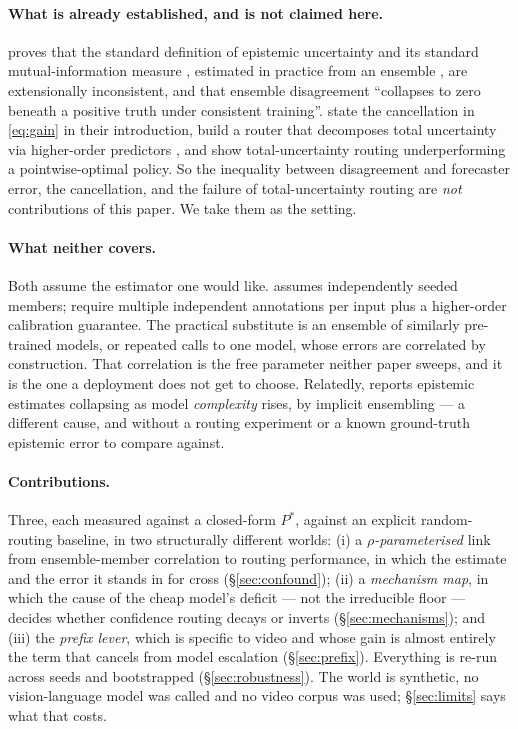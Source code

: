 \documentclass[10pt]{article}
\newcommand{\Pstar}{P^{*}}
\begin{document}
\paragraph{What is already established, and is not claimed here.}
\citet{young2026epistemic} proves that the standard definition of epistemic uncertainty and its
standard mutual-information measure \citep{houlsby2011bayesian, depeweg2018decomposition},
estimated in practice from an ensemble \citep{lakshminarayanan2017simple}, are
extensionally inconsistent, and that ensemble disagreement ``collapses to zero beneath a positive
truth under consistent training''. \citet{peale2026flexible} state the cancellation in
\eqref{eq:gain} in their introduction, build a router that decomposes total uncertainty via
higher-order predictors \citep{ahdritz2025provable}, and show total-uncertainty routing
underperforming a pointwise-optimal policy. So the inequality between disagreement and forecaster
error, the cancellation, and the failure of total-uncertainty routing are \emph{not}
contributions of this paper. We take them as the setting.

\paragraph{What neither covers.}
Both assume the estimator one would like. \citet{young2026epistemic} assumes independently seeded
members; \citet{peale2026flexible} require multiple independent annotations per input plus a
higher-order calibration guarantee. The practical substitute is an ensemble of similarly
pre-trained models, or repeated calls to one model, whose errors are correlated by construction.
That correlation is the free parameter neither paper sweeps, and it is the one a deployment does
not get to choose. Relatedly, \citet{kirsch2024implicit} reports epistemic estimates collapsing as
model \emph{complexity} rises, by implicit ensembling --- a different cause, and without a routing
experiment or a known ground-truth epistemic error to compare against.

\paragraph{Contributions.} Three, each measured against a closed-form $\Pstar$, against an explicit
random-routing baseline, in two structurally different worlds: (i) a \emph{$\rho$-parameterised}
link from ensemble-member correlation to routing performance, in which the estimate and the error
it stands in for cross (\S\ref{sec:confound}); (ii) a \emph{mechanism map}, in which the cause of
the cheap model's deficit --- not the irreducible floor --- decides whether confidence routing
decays or inverts (\S\ref{sec:mechanisms}); and (iii) the \emph{prefix lever}, which is specific to
video and whose gain is almost entirely the term that cancels from model escalation
(\S\ref{sec:prefix}). Everything is re-run across seeds and bootstrapped
(\S\ref{sec:robustness}). The world is synthetic, no vision-language model was called and no video
corpus was used; \S\ref{sec:limits} says what that costs.
\end{document}
